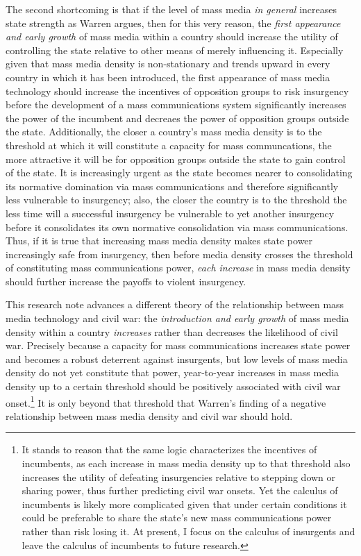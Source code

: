 \documentclass[11pt,article,oneside]{memoir}
\begin{document}
The second shortcoming is that if the level of mass media \emph{in
general} increases state strength as Warren argues, then for this very
reason, the \emph{first appearance and early growth} of mass media
within a country should increase the utility of controlling the state
relative to other means of merely influencing it. Especially given that
mass media density is non-stationary and trends upward in every country
in which it has been introduced, the first appearance of mass media
technology should increase the incentives of opposition groups to risk
insurgency before the development of a mass communications system
significantly increases the power of the incumbent and decreaes the
power of opposition groups outside the state. Additionally, the closer a
country's mass media density is to the threshold at which it will
constitute a capacity for mass communcations, the more attractive it
will be for opposition groups outside the state to gain control of the
state. It is increasingly urgent as the state becomes nearer to
consolidating its normative domination via mass communications and
therefore significantly less vulnerable to insurgency; also, the closer
the country is to the threshold the less time will a successful
insurgency be vulnerable to yet another insurgency before it
consolidates its own normative consolidation via mass communications.
Thus, if it is true that increasing mass media density makes state power
increasingly safe from insurgency, then before media density crosses the
threshold of constituting mass communications power, \emph{each
increase} in mass media density should further increase the payoffs to
violent insurgency.

This research note advances a different theory of the relationship
between mass media technology and civil war: the \emph{introduction and
early growth} of mass media density within a country \emph{increases}
rather than decreases the likelihood of civil war. Precisely because a
capacity for mass communications increases state power and becomes a
robust deterrent against insurgents, but low levels of mass media
density do not yet constitute that power, year-to-year increases in mass
media density up to a certain threshold should be positively associated
with civil war onset.\footnote{It stands to reason that the same logic
  characterizes the incentives of incumbents, as each increase in mass
  media density up to that threshold also increases the utility of
  defeating insurgencies relative to stepping down or sharing power,
  thus further predicting civil war onsets. Yet the calculus of
  incumbents is likely more complicated given that under certain
  conditions it could be preferable to share the state's new mass
  communications power rather than risk losing it. At present, I focus
  on the calculus of insurgents and leave the calculus of incumbents to
  future research.} It is only beyond that threshold that Warren's
finding of a negative relationship between mass media density and civil
war should hold.
\end{document}
